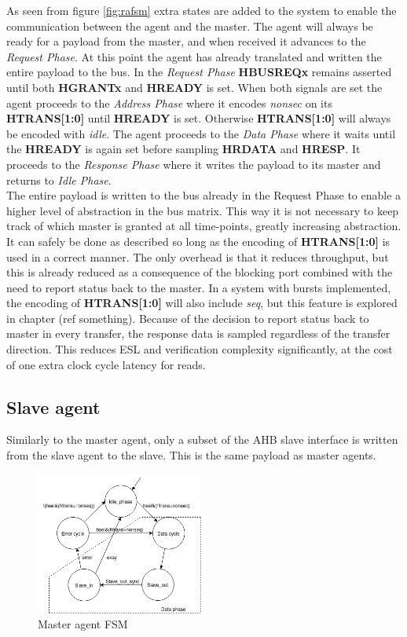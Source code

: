 As seen from figure \ref{fig:rafsm} extra states are added to the system to enable the communication between the agent and the master. The agent will always be ready for a payload from the master, and when received it advances to the \textit{Request Phase}. At this point the agent has already translated and written the entire payload to the bus. In the \textit{Request Phase} \textbf{HBUSREQx} remains asserted until both \textbf{HGRANTx} and \textbf{HREADY} is set. When both signals are set the agent proceeds to the \textit{Address Phase} where it encodes \textit{nonsec} on its \textbf{HTRANS[1:0]} until \textbf{HREADY} is set. Otherwise \textbf{HTRANS[1:0]} will always be encoded with \textit{idle}. The agent proceeds to the \textit{Data Phase} where it waits until the \textbf{HREADY} is again set before sampling \textbf{HRDATA} and \textbf{HRESP}. It proceeds to the \textit{Response Phase} where it writes the payload to its master and returns to \textit{Idle Phase}. \\
\newline
The entire payload is written to the bus already in the Request Phase to enable a higher level of abstraction in the bus matrix. This way it is not necessary to keep track of which master is granted at all time-points, greatly increasing abstraction. It can safely be done as described so long as the encoding of \textbf{HTRANS[1:0]} is used in a correct manner. The only overhead is that it reduces throughput, but this is already reduced as a consequence of the blocking port combined with the need to report status back to the master. In a system with bursts implemented, the encoding of \textbf{HTRANS[1:0]} will also include \textit{seq}, but this feature is explored in chapter (ref something). Because of the decision to report status back to master in every transfer, the response data is sampled regardless of the transfer direction. This reduces ESL and verification complexity significantly, at the cost of one extra clock cycle latency for reads. 

\subsection{Slave agent}
Similarly to the master agent, only a subset of the AHB slave interface is written from the slave agent to the slave. This is the same payload as master agents. 

\begin{figure}
\includegraphics[width=5.5cm]{figs/hw/sAgent_FSM.png}
\caption{Master agent FSM}\label{fig:rsfsm}
\end{figure}  

